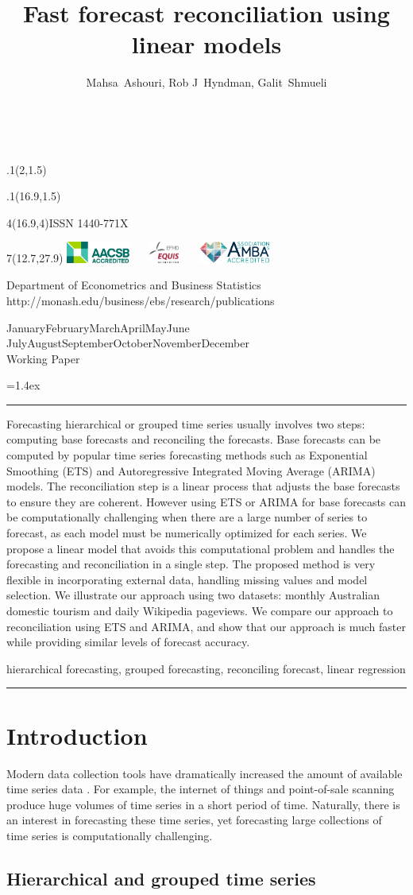 \documentclass[11pt,a4paper,]{article}
\title{Fast forecast reconciliation using linear models}
\author{Mahsa~Ashouri, Rob J~Hyndman, Galit~Shmueli}
\date{\sf\Date~\Month~\Year}
\makeatletter
\def\Date{\number\day}
\def\Month{\ifcase\month\or
 January\or February\or March\or April\or May\or June\or
 July\or August\or September\or October\or November\or December\fi}
\def\Year{\number\year}
\def\showjel{{\large\textsf{\textbf{JEL classification:}}~\@jel}}
\def\cover{{\sffamily\setcounter{page}{0}
        \thispagestyle{empty}
        \placefig{2}{1.5}{width=5cm}{monash2}
        \placefig{16.9}{1.5}{width=2.1cm}{MBusSchool}
        \begin{textblock}{4}(16.9,4)ISSN 1440-771X\end{textblock}
        \begin{textblock}{7}(12.7,27.9)\hfill
        \includegraphics[height=0.7cm]{AACSB}~~~
        \includegraphics[height=0.7cm]{EQUIS}~~~
        \includegraphics[height=0.7cm]{AMBA}
        \end{textblock}
        \vspace*{2cm}
        \begin{center}\Large
        Department of Econometrics and Business Statistics\\[.5cm]
        \footnotesize http://monash.edu/business/ebs/research/publications
        \end{center}\vspace{2cm}
        \begin{center}
        \fbox{\parbox{14cm}{\begin{onehalfspace}\centering\Huge\vspace*{0.3cm}
                \textsf{\textbf{\expandafter{\@title}}}\vspace{1cm}\par
                \LARGE\@author\end{onehalfspace}
        }}
        \end{center}
        \vfill
                \begin{center}\Large
                \Month~\Year\\[1cm]
                Working Paper \@wp
        \end{center}\vspace*{2cm}}}
\def\pageone{{\sffamily\setstretch{1}%
        \thispagestyle{empty}%
        \vbox to \textheight{%
        \raggedright\baselineskip=1.2cm
     {\fontsize{24.88}{30}\sffamily\textbf{\expandafter{\@title}}}
        \vspace{2cm}\par
        \hspace{1cm}\parbox{14cm}{\sffamily\large\@addresses}\vspace{1cm}\vfill
        \hspace{1cm}{\large\Date~\Month~\Year}\\[1cm]
        \hspace{1cm}\showjel\vss}}}
\def\blindtitle{{\sffamily
     \thispagestyle{plain}\raggedright\baselineskip=1.2cm
     {\fontsize{24.88}{30}\sffamily\textbf{\expandafter{\@title}}}\vspace{1cm}\par
        }}
\def\titlepage{{\cover\newpage\pageone\newpage\blindtitle}}
\let\maketitle\titlepage
\newenvironment{keywords}{\par\vspace{0.5cm}\noindent{\sffamily\textbf{Keywords:}}}{\vspace{0.25cm}\par\hrule\vspace{0.5cm}\par}
\renewenvironment{abstract}{\begin{minipage}{\textwidth}\parskip=1.4ex\noindent
\hrule\vspace{0.1cm}\par{\sffamily\textbf{\abstractname}}\newline}
  {\end{minipage}}
\def\placefig#1#2#3#4{\begin{textblock}{.1}(#1,#2)\rlap{\texttt{[image: \#4]}}\end{textblock}}
\makeatother
\begin{document}
\maketitle
\begin{abstract}
Forecasting hierarchical or grouped time series usually involves two steps: computing base forecasts and reconciling the forecasts. Base forecasts can be computed by popular time series forecasting methods such as Exponential Smoothing (ETS) and Autoregressive Integrated Moving Average (ARIMA) models. The reconciliation step is a linear process that adjusts the base forecasts to ensure they are coherent. However using ETS or ARIMA for base forecasts can be computationally challenging when there are a large number of series to forecast, as each model must be numerically optimized for each series. We propose a linear model that avoids this computational problem and handles the forecasting and reconciliation in a single step. The proposed method is very flexible in incorporating external data, handling missing values and model selection. We illustrate our approach using two datasets: monthly Australian domestic tourism and daily Wikipedia pageviews. We compare our approach to reconciliation using ETS and ARIMA, and show that our approach is much faster while providing similar levels of forecast accuracy.
\end{abstract}
\begin{keywords}
hierarchical forecasting, grouped forecasting, reconciling forecast, linear regression
\end{keywords}

\hypertarget{introduction}{%
\section{Introduction}\label{introduction}}

Modern data collection tools have dramatically increased the amount of available time series data \autocite{januschowski2013forecasting}. For example, the internet of things and point-of-sale scanning produce huge volumes of time series in a short period of time. Naturally, there is an interest in forecasting these time series, yet forecasting large collections of time series is computationally challenging.

\hypertarget{hierarchical-and-grouped-time-series}{%
\subsection{Hierarchical and grouped time series}\label{hierarchical-and-grouped-time-series}}
\end{document}
